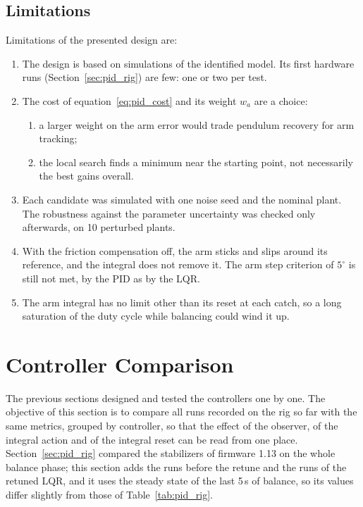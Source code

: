 \documentclass[a4paper,11pt]{article}
\begin{document}
\subsection{Limitations}
Limitations of the presented design are:
\begin{enumerate}
  \item The design is based on simulations of the identified model. Its first hardware runs (Section~\ref{sec:pid_rig}) are few: one or two per test.
  \item The cost of equation~\ref{eq:pid_cost} and its weight $w_a$ are a choice:
  \begin{enumerate}
    \item a larger weight on the arm error would trade pendulum recovery for arm tracking;
    \item the local search finds a minimum near the starting point, not necessarily the best gains overall.
  \end{enumerate}
  \item Each candidate was simulated with one noise seed and the nominal plant. The robustness against the parameter uncertainty was checked only afterwards, on 10 perturbed plants.
  \item With the friction compensation off, the arm sticks and slips around its reference, and the integral does not remove it. The arm step criterion of $5^\circ$ is still not met, by the PID as by the LQR.
  \item The arm integral has no limit other than its reset at each catch, so a long saturation of the duty cycle while balancing could wind it up.
\end{enumerate}

\section{Controller Comparison}
\label{sec:ctrl_compare}
The previous sections designed and tested the controllers one by one. The objective of this section is to compare all runs recorded on the rig so far with the same metrics, grouped by controller, so that the effect of the observer, of the integral action and of the integral reset can be read from one place. Section~\ref{sec:pid_rig} compared the stabilizers of firmware 1.13 on the whole balance phase; this section adds the runs before the retune and the runs of the retuned LQR, and it uses the steady state of the last 5\,s of balance, so its values differ slightly from those of Table~\ref{tab:pid_rig}.
\end{document}
